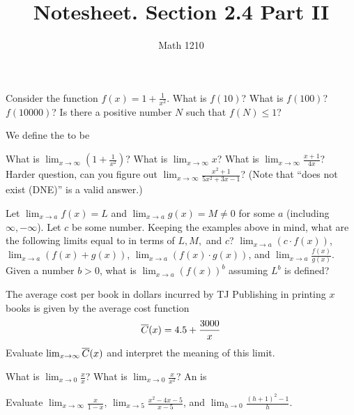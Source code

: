 \documentclass[12pt, a4paper]{article}
\author{Math 1210}
\title{Notesheet. Section 2.4 Part II}
\date{}
\begin{document}
\maketitle
\nameline
\begin{ex}
  Consider the function \(f(x) = 1 + \frac{1}{x^2}\). What is
  \(f(10)\)? What is \(f(100)\)? \(f(10000)\)? Is there a positive
  number \(N\) such that \(f(N) \leq 1\)?
\end{ex}
\begin{defi}
  We define the  to be
\end{defi}
\begin{ex}
  What is \(\lim_{x \to \infty} \left(1+\frac{1}{x^2}\right)\)? What is \(\lim_{x
  \to \infty} x\)? What is \(\lim_{x \to \infty} \frac{x+1}{4x}\)?
 Harder question, can you figure out \(\lim_{x \to \infty} \frac{x^2+1}{5x^2+3x-1}\)? (Note that
``does not exist (DNE)'' is a valid answer.)
\end{ex}
\pagebreak
\begin{ex}
  Let \(\lim_{x \to a} f(x) = L\) and \(\lim_{x \to a} g(x) = M \neq
  0\) for some \(a\) (including
  \(\infty,-\infty\)). Let \(c\) be some number. Keeping the examples above in mind, what are
  the following limits equal to in terms of \(L,M,\) and \(c\)?
  \(\lim_{x \to a}(c \cdot f(x))\), \(\lim_{x \to a}(f(x)+g(x))\),
  \(\lim_{x \to a} (f(x) \cdot g(x))\), and \(\lim_{x \to a}
  \frac{f(x)}{g(x)}\). Given a number \(b > 0\), what is \(\lim_{x \to
  a} (f(x))^b\) assuming \(L^b\) is defined?
\end{ex}
\begin{ex}
  The average cost per book in dollars incurred by TJ Publishing in
  printing \(x\) books is given by the average cost function \[
    \overline{C}(x) = 4.5 + \frac{3000}{x}
  \]
  Evaluate \(\lim_{x \to \infty} \overline{C}(x)\) and interpret the meaning
  of this limit.
\end{ex}
\begin{defi}
    What is \(\lim_{x \to 0} \frac{x}{x}\)? What is \(\lim_{x \to 0}
  \frac{x}{x^2}\)? An  is
\end{defi}
\begin{ex}
  Evaluate \(\lim_{x \to \infty} \frac{x}{1-x}\), \(\lim_{x \to 5}
  \frac{x^2-4x-5}{x-5}\), and \(\lim_{h \to 0} \frac{(h+1)^2 - 1}{h}\).
\end{ex}
\end{document}
